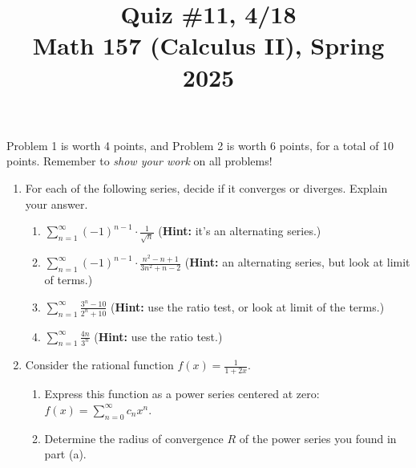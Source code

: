 \documentclass[11pt]{article}
\title{Quiz \#11, 4/18\\ Math 157 (Calculus II), Spring 2025}
\date{}
\begin{document}
\maketitle

\thispagestyle{empty}

\vspace{-2cm}

Problem 1 is worth 4 points, and Problem 2 is worth 6 points, for a total of 10 points. Remember to \emph{show your work} on all problems!

\begin{enumerate}

\item For each of the following series, decide if it converges or diverges. Explain your answer.

\begin{enumerate}
\item $\displaystyle \sum_{n=1}^{\infty} (-1)^{n-1} \cdot \frac{1}{\sqrt{n}}$ \hfill ({\bf Hint:} it's an alternating series.)
\item $\displaystyle \sum_{n=1}^{\infty} (-1)^{n-1}\cdot \frac{n^2-n+1}{3n^2+n-2} $ \hfill ({\bf Hint:} an alternating series, but look at limit of terms.)
\item $\displaystyle \sum_{n=1}^{\infty} \frac{3^n-10}{2^n+10}$ \hfill ({\bf Hint:} use the ratio test, or look at limit of the terms.)
\item $\displaystyle \sum_{n=1}^{\infty} \frac{4n}{3^n}$ \hfill ({\bf Hint:} use the ratio test.)
\end{enumerate}

\vspace{1.75in}

\item Consider the rational function $f(x) = \displaystyle \frac{1}{1+2x}$.
\begin{enumerate}
\item Express this function as a power series centered at zero: $f(x) = \displaystyle \sum_{n=0}^{\infty} c_n x^n$.
\item Determine the radius of convergence $R$ of the power series you found in part (a).
\end{enumerate}

\end{enumerate}
\end{document}
